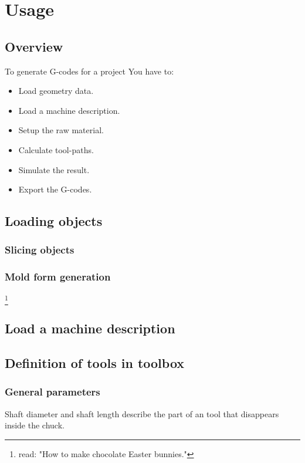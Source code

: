 \chapter{Usage}

\section{Overview}

To generate G-codes for a project You have to:

\begin{itemize}
\item Load geometry data.
\item Load a machine description.
\item Setup the raw material.
\item Calculate tool-paths.
\item Simulate the result.
\item Export the G-codes.
\end{itemize}

\section{Loading objects}

\subsection{Slicing objects}

\subsection{Mold form generation}

\footnote{read: "How to make chocolate Easter bunnies."}

\section{Load a machine description}


\section{Definition of tools in toolbox}

\subsection{General parameters}

Shaft diameter and shaft length describe the part of an tool that
disappears inside the chuck. 

